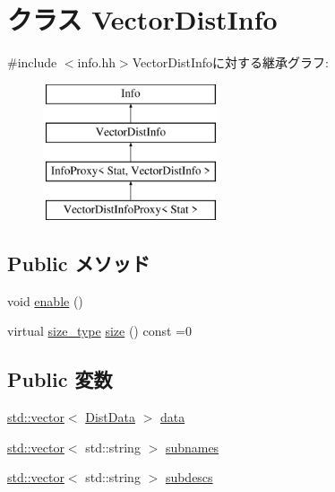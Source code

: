 \hypertarget{classStats_1_1VectorDistInfo}{
\section{クラス VectorDistInfo}
\label{classStats_1_1VectorDistInfo}
}


{\ttfamily \#include $<$info.hh$>$}VectorDistInfoに対する継承グラフ:\begin{figure}[H]
\begin{center}
\leavevmode
\includegraphics[height=4cm]{classStats_1_1VectorDistInfo}
\end{center}
\end{figure}
\subsection*{Public メソッド}
\begin{DoxyCompactItemize}
\item 
void \hyperlink{classStats_1_1VectorDistInfo_a486f22824bd83c5308a0d70ffac6f758}{enable} ()
\item 
virtual \hyperlink{namespaceStats_ada51e68d31936547d3729c82daf6b7c6}{size\_\-type} \hyperlink{classStats_1_1VectorDistInfo_a4051d143efd31726fa13df03ae4e1bce}{size} () const =0
\end{DoxyCompactItemize}
\subsection*{Public 変数}
\begin{DoxyCompactItemize}
\item 
\hyperlink{classstd_1_1vector}{std::vector}$<$ \hyperlink{structStats_1_1DistData}{DistData} $>$ \hyperlink{classStats_1_1VectorDistInfo_af1c9f5a3b68f4b752f129d4c834f3f78}{data}
\item 
\hyperlink{classstd_1_1vector}{std::vector}$<$ std::string $>$ \hyperlink{classStats_1_1VectorDistInfo_a3b95ca426d97cab365cc623926fdd294}{subnames}
\item 
\hyperlink{classstd_1_1vector}{std::vector}$<$ std::string $>$ \hyperlink{classStats_1_1VectorDistInfo_a722488efce925fb896e4111f77731f25}{subdescs}
\end{DoxyCompactItemize}
